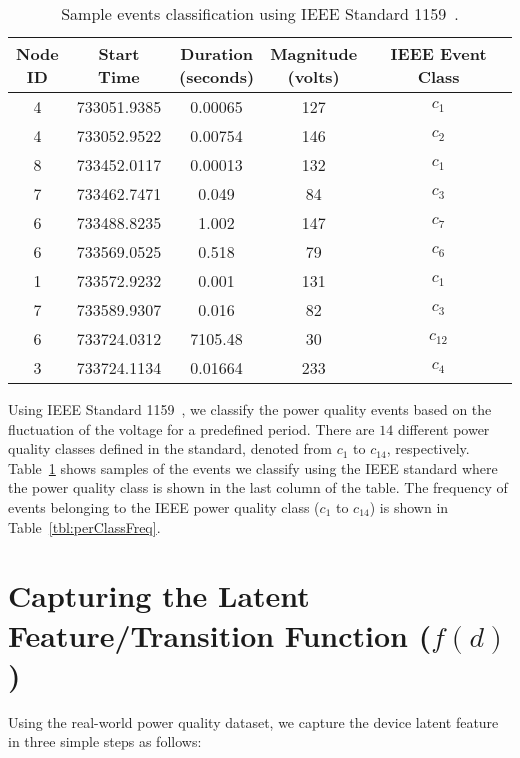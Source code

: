 \begin{table}[!t]
\caption{Sample events classification using IEEE Standard 1159~\cite{IEEE09_1159}.}
\centering 
\begin{tabular}{|c|c|c|c|c|}
\hline \specialcell{Node\\ID} & Start Time & \specialcell{Duration\\(seconds)} & \specialcell{Magnitude\\(volts)} & IEEE Event Class\tabularnewline
\hline 4 & 733051.9385 & 0.00065 & 127 & $c_1$\tabularnewline
 4 & 733052.9522 & 0.00754 & 146 & $c_2$\tabularnewline
 8 & 733452.0117 & 0.00013 & 132 & $c_1$\tabularnewline
 7 & 733462.7471 & 0.049 & 84 & $c_3$\tabularnewline
 6 & 733488.8235 & 1.002 & 147 & $c_7$\tabularnewline
 6 & 733569.0525 & 0.518 & 79 & $c_6$\tabularnewline
 1 & 733572.9232 & 0.001 & 131 & $c_1$\tabularnewline
 7 & 733589.9307 & 0.016 & 82 & $c_3$\tabularnewline
 6 & 733724.0312 & 7105.48 & 30 & $c_{12}$\tabularnewline
 3 & 733724.1134 & 0.01664 & 233 & $c_4$\tabularnewline
\hline 
\end{tabular}
\label{tbl:sampleClassData}
\end{table}

Using IEEE Standard 1159~\cite{IEEE09_1159}, we classify the power quality events based on the fluctuation of the voltage for a predefined period. There are $14$ different power quality classes defined in the standard, denoted from $c_1$ to $c_{14}$, respectively. Table~\ref{tbl:sampleClassData} shows samples of the events we classify using the IEEE standard where the power quality class is shown in the last column of the table. The frequency of events belonging to the IEEE power quality class ($c_1$ to $c_{14}$) is shown in Table~\ref{tbl:perClassFreq}.

\section{Capturing the Latent Feature/Transition Function ($f(d)$)}
Using the real-world power quality dataset, we capture the device latent feature in three simple steps as follows:

